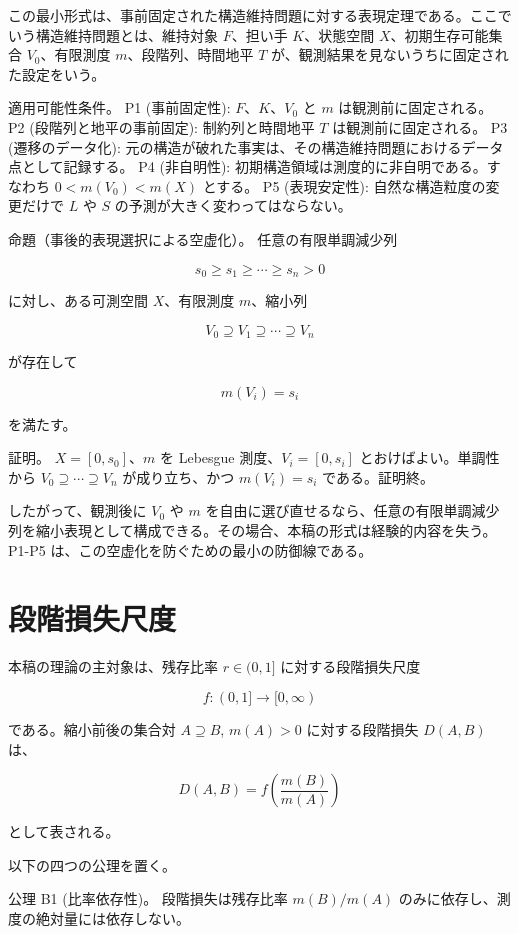 \documentclass[12pt,a4paper]{article}
\begin{document}
この最小形式は、事前固定された構造維持問題に対する表現定理である。ここでいう構造維持問題とは、維持対象 \(F\)、担い手 \(K\)、状態空間 \(X\)、初期生存可能集合 \(V_0\)、有限測度 \(m\)、段階列、時間地平 \(T\) が、観測結果を見ないうちに固定された設定をいう。

適用可能性条件。 P1 (事前固定性): \(F\)、\(K\)、\(V_0\) と \(m\) は観測前に固定される。 P2 (段階列と地平の事前固定): 制約列と時間地平 \(T\) は観測前に固定される。 P3 (遷移のデータ化): 元の構造が破れた事実は、その構造維持問題におけるデータ点として記録する。 P4 (非自明性): 初期構造領域は測度的に非自明である。すなわち \(0<m(V_0)<m(X)\) とする。 P5 (表現安定性): 自然な構造粒度の変更だけで \(L\) や \(S\) の予測が大きく変わってはならない。

命題（事後的表現選択による空虚化）。 任意の有限単調減少列

\[
s_0 \ge s_1 \ge \cdots \ge s_{n} > 0
\]

に対し、ある可測空間 \(X\)、有限測度 \(m\)、縮小列

\[
V_0 \supseteq V_1 \supseteq \cdots \supseteq V_{n}
\]

が存在して

\[
m(V_{i}) = s_{i}
\]

を満たす。

証明。 \(X=[0,s_0]\)、\(m\) を Lebesgue 測度、\(V_{i}=[0,s_{i}]\) とおけばよい。単調性から \(V_0 \supseteq \cdots \supseteq V_{n}\) が成り立ち、かつ \(m(V_{i})=s_{i}\) である。証明終。

したがって、観測後に \(V_0\) や \(m\) を自由に選び直せるなら、任意の有限単調減少列を縮小表現として構成できる。その場合、本稿の形式は経験的内容を失う。P1-P5 は、この空虚化を防ぐための最小の防御線である。

\section{段階損失尺度}\label{ux6bb5ux968eux640dux5931ux5c3aux5ea6}

本稿の理論の主対象は、残存比率 \(r \in (0,1]\) に対する段階損失尺度

\[
f : (0,1] \to [0,\infty)
\]

である。縮小前後の集合対 \(A \supseteq B\), \(m(A)>0\) に対する段階損失 \(D(A,B)\) は、

\[
D(A,B) = f\left(\frac{m(B)}{m(A)}\right)
\]

として表される。

以下の四つの公理を置く。

公理 B1 (比率依存性)。 段階損失は残存比率 \(m(B)/m(A)\) のみに依存し、測度の絶対量には依存しない。
\end{document}
